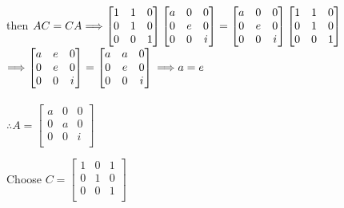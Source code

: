 \documentclass[12pt]{article}
\begin{document}
\hfill\begin{minipage}{\dimexpr\textwidth-10mm}
	then $AC=CA
		\\\\
		\Longrightarrow\begin{bmatrix}
			1 & 1 & 0 \\
			0 & 1 & 0 \\
			0 & 0 & 1 \\
		\end{bmatrix}\begin{bmatrix}
			a & 0 & 0 \\
			0 & e & 0 \\
			0 & 0 & i \\
		\end{bmatrix} = \begin{bmatrix}
			a & 0 & 0 \\
			0 & e & 0 \\
			0 & 0 & i \\
		\end{bmatrix}\begin{bmatrix}
			1 & 1 & 0 \\
			0 & 1 & 0 \\
			0 & 0 & 1 \\
		\end{bmatrix}$\\
	$\Longrightarrow\begin{bmatrix}
			a & e & 0 \\
			0 & e & 0 \\
			0 & 0 & i \\
		\end{bmatrix} = \begin{bmatrix}
			a & a & 0 \\
			0 & e & 0 \\
			0 & 0 & i \\
		\end{bmatrix}
		\\\\
		\Longrightarrow a = e$
	\\\\
	$\therefore A = \begin{bmatrix}
			a & 0 & 0 \\
			0 & a & 0 \\
			0 & 0 & i \\
		\end{bmatrix}$

\end{minipage}
\newpage
\noindent\noindent Choose $C = \begin{bmatrix}
		1 & 0 & 1 \\
		0 & 1 & 0 \\
		0 & 0 & 1 \\
	\end{bmatrix}$
\end{document}
